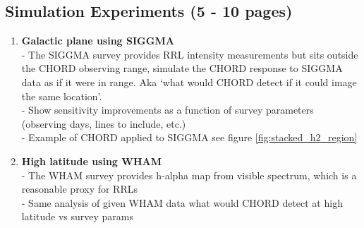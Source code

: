 \subsection{Simulation Experiments (5 - 10 pages)}
\begin{enumerate}
    \item \textbf{Galactic plane using SIGGMA}\\
    - The SIGGMA survey provides RRL intensity measurements but sits outside the CHORD observing range, simulate the CHORD response to SIGGMA data as if it were in range. Aka `what would CHORD detect if it could image the same location'.\\
    - Show sensitivity improvements as a function of survey parameters (observing days, lines to include, etc.)\\
    - Example of CHORD applied to SIGGMA see figure \ref{fig:stacked_h2_region}
    \item \textbf{High latitude using WHAM}\\
    - The WHAM survey provides h-alpha map from visible spectrum, which is a reasonable proxy for RRLs\\
    - Same analysis of given WHAM data what would CHORD detect at high latitude vs survey params
\end{enumerate}